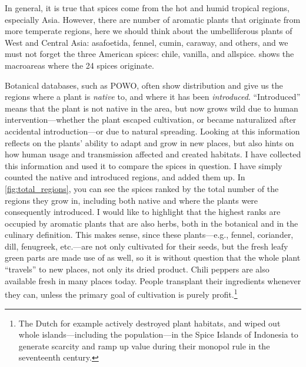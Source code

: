 In general, it is true that spices come from the hot and humid tropical regions, especially Asia. However, there are number of aromatic plants that originate from more temperate regions, here we should think about the umbelliferous plants of West and Central Asia: asafoetida, fennel, cumin, caraway, and others, and we must not forget the three American spices: chile, vanilla, and allspice.  shows the macroareas where the 24 spices originate.

Botanical databases, such as \gls{POWO}, often show distribution and  give us the regions where a plant is \textit{native} to, and where it has been \textit{introduced}. ``Introduced'' means that the plant is not native in the area, but now grows wild due to human intervention---whether the plant escaped cultivation, or became naturalized after accidental introduction---or due to natural spreading. Looking at this information reflects on the plants' ability to adapt and grow in new places, but also hints on how human usage and transmission affected and created habitats. I have collected this information and used it to compare the spices in question. I have simply counted the native and introduced regions, and added them up. In \cref{fig:total_regions}, you can see the spices ranked by the total number of the regions they grow in, including both native and where the plants were consequently introduced. I would like to highlight that the highest ranks are occupied by aromatic plants that are also herbs, both in the botanical and in the culinary definition. This makes sense, since these plants---e.g., fennel, coriander, dill, fenugreek, etc.---are not only cultivated for their seeds, but the fresh leafy green parts are made use of as well, so it is without question that the whole plant ``travels'' to new places, not only its dried product. Chili peppers are also available fresh in many places today. People transplant their ingredients whenever they can, unless the primary goal of cultivation is purely profit.\footnote{The Dutch for example actively destroyed plant habitats, and wiped out whole islands---including the population---in the Spice Islands of Indonesia to generate scarcity and ramp up value during their monopol rule in the seventeenth century.}

